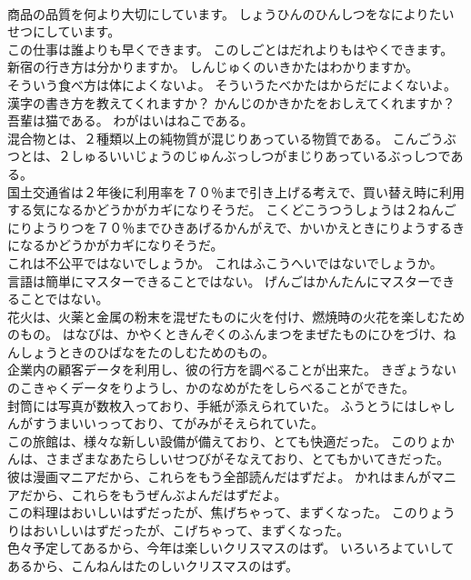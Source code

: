\documentclass[8pt]{extreport}
\begin{document}
\begin{CJK}{UTF8}{min}
\\	商品の品質を何より大切にしています。	しょうひんのひんしつをなによりたいせつにしています。 
\\	この仕事は誰よりも早くできます。	このしごとはだれよりもはやくできます。 
\\	新宿の行き方は分かりますか。	しんじゅくのいきかたはわかりますか。 
\\	そういう食べ方は体によくないよ。	そういうたべかたはからだによくないよ。 
\\	漢字の書き方を教えてくれますか？	かんじのかきかたをおしえてくれますか？ 
\\	吾輩は猫である。	わがはいはねこである。 
\\	混合物とは、２種類以上の純物質が混じりあっている物質である。	こんごうぶつとは、２しゅるいいじょうのじゅんぶっしつがまじりあっているぶっしつである。 
\\	国土交通省は２年後に利用率を７０％まで引き上げる考えで、買い替え時に利用する気になるかどうかがカギになりそうだ。	こくどこうつうしょうは２ねんごにりようりつを７０％までひきあげるかんがえで、かいかえときにりようするきになるかどうかがカギになりそうだ。 
\\	これは不公平ではないでしょうか。	これはふこうへいではないでしょうか。 
\\	言語は簡単にマスターできることではない。	げんごはかんたんにマスターできることではない。 
\\	花火は、火薬と金属の粉末を混ぜたものに火を付け、燃焼時の火花を楽しむためのもの。	はなびは、かやくときんぞくのふんまつをまぜたものにひをづけ、ねんしょうときのひばなをたのしむためのもの。 
\\	企業内の顧客データを利用し、彼の行方を調べることが出来た。	きぎょうないのこきゃくデータをりようし、かのなめがたをしらべることができた。 
\\	封筒には写真が数枚入っており、手紙が添えられていた。	ふうとうにはしゃしんがすうまいいっっており、てがみがそえられていた。 
\\	この旅館は、様々な新しい設備が備えており、とても快適だった。	このりょかんは、さまざまなあたらしいせつびがそなえており、とてもかいてきだった。 
\\	彼は漫画マニアだから、これらをもう全部読んだはずだよ。	かれはまんがマニアだから、これらをもうぜんぶよんだはずだよ。 
\\	この料理はおいしいはずだったが、焦げちゃって、まずくなった。	このりょうりはおいしいはずだったが、こげちゃって、まずくなった。 
\\	色々予定してあるから、今年は楽しいクリスマスのはず。	いろいろよていしてあるから、こんねんはたのしいクリスマスのはず。 

\end{CJK}
\end{document}
